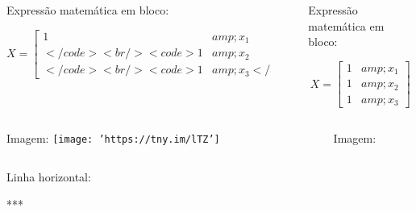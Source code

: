 \documentclass[
]{book}
\begin{document}
\begin{columns}

\begin{column}

Expressão matemática em bloco:

\[X = \begin{bmatrix}1 &amp; x_{1}\\</code><br />
<code>1 &amp; x_{2}\\</code><br />
<code>1 &amp; x_{3}</code><br />
<code>\end{bmatrix}\]

\end{column}

\begin{column}

~

\end{column}

\begin{column}

Expressão matemática em bloco:

{\[X = \begin{bmatrix}1 &amp; x_{1}\\
1 &amp; x_{2}\\
1 &amp; x_{3}
\end{bmatrix}\]}

\end{column}

\end{columns}

\begin{columns}

\begin{column}

Imagem: \texttt{[image: 'https://tny.im/lTZ']}

\end{column}

\begin{column}

~

\end{column}

\begin{column}

Imagem:

\end{column}

\end{columns}

\begin{column}

Linha horizontal:

***

\end{column}
\end{document}
